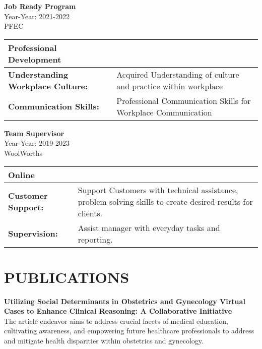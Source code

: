 \documentclass[a4paper,9pt]{article}
\begin{document}
\noindent
\textbf{Job Ready Program} \\
Year-Year: 2021-2022 \\
PFEC \\ 
\begin{table}[h]
\centering
\begin{tabular}{|p{}|p{}|}
\hline
\textbf{Professional Development} & \\
\hline
\textbf{Understanding Workplace Culture:} & Acquired Understanding of culture and practice within workplace \\
\hline
\textbf{Communication Skills:} & Professional Communication Skills for Workplace Communication \\
\hline
\end{tabular}
\end{table}

\textbf{Team Supervisor} \\
Year-Year: 2019-2023 \\
WoolWorths \\ 

\begin{table}[h]
\centering
\begin{tabular}{|p{}|p{}|}
\hline
\textbf{Online} & \\
\hline
\textbf{Customer Support:} & Support Customers with technical assistance, problem-solving skills to create desired results for clients. \\
\hline
\textbf{Supervision:} & Assist manager with everyday tasks and reporting. \\
\hline
\end{tabular}
\end{table}



\section*{PUBLICATIONS}

\textbf{Utilizing Social Determinants in Obstetrics and Gynecology Virtual Cases to Enhance Clinical Reasoning: A Collaborative Initiative } \\ \newline
The article endeavor aims to address crucial facets of medical education, cultivating awareness, and empowering future healthcare professionals to address and mitigate health disparities within obstetrics and gynecology. 
\end{document}
